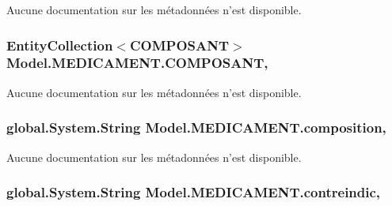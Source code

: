 Aucune documentation sur les métadonnées n'est disponible. 

\hypertarget{class_model_1_1_m_e_d_i_c_a_m_e_n_t_a1faa12602862fab1081752b148f1745b}{
\subsubsection[{C\-O\-M\-P\-O\-S\-A\-N\-T}]{\setlength{\rightskip}{0pt plus 5cm}Entity\-Collection$<${\bf C\-O\-M\-P\-O\-S\-A\-N\-T}$>$ Model.\-M\-E\-D\-I\-C\-A\-M\-E\-N\-T.\-C\-O\-M\-P\-O\-S\-A\-N\-T\hspace{0.3cm}{\ttfamily [get]}, {\ttfamily [set]}}}\label{class_model_1_1_m_e_d_i_c_a_m_e_n_t_a1faa12602862fab1081752b148f1745b}


Aucune documentation sur les métadonnées n'est disponible. 

\hypertarget{class_model_1_1_m_e_d_i_c_a_m_e_n_t_af047e823d0f57ffd36009d48ddae4a9c}{
\subsubsection[{composition}]{\setlength{\rightskip}{0pt plus 5cm}global.\-System.\-String Model.\-M\-E\-D\-I\-C\-A\-M\-E\-N\-T.\-composition\hspace{0.3cm}{\ttfamily [get]}, {\ttfamily [set]}}}\label{class_model_1_1_m_e_d_i_c_a_m_e_n_t_af047e823d0f57ffd36009d48ddae4a9c}


Aucune documentation sur les métadonnées n'est disponible. 

\hypertarget{class_model_1_1_m_e_d_i_c_a_m_e_n_t_adfdf391b99b65867478accf4a5bb6453}{
\subsubsection[{contreindic}]{\setlength{\rightskip}{0pt plus 5cm}global.\-System.\-String Model.\-M\-E\-D\-I\-C\-A\-M\-E\-N\-T.\-contreindic\hspace{0.3cm}{\ttfamily [get]}, {\ttfamily [set]}}}\label{class_model_1_1_m_e_d_i_c_a_m_e_n_t_adfdf391b99b65867478accf4a5bb6453}


